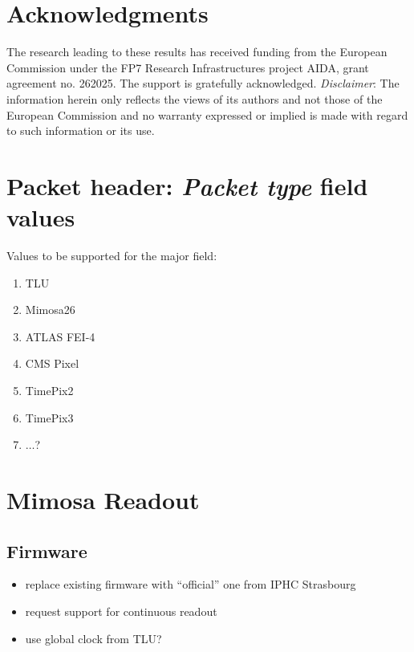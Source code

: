 \documentclass[paper=a4, fontsize=11pt, titlepage]{scrartcl}	%
\numberwithin{equation}{section}		%
\numberwithin{figure}{section}			%
\numberwithin{table}{section}           	%
\begin{document}
\section{Acknowledgments}

  The research leading to these results has received funding from the
  European Commission under the FP7 Research Infrastructures project
  AIDA, grant agreement no. 262025. The support is gratefully
  acknowledged. 
  \emph{Disclaimer}: The information herein only reflects the views of its authors and not those of the European Commission and no warranty expressed or implied is made with regard to such information or its use.

\newpage
\appendix

\section{Packet header: \emph{Packet type} field values}
\label{app:packettype}
Values to be supported for the major field:
\begin{enumerate}
\item TLU
\item Mimosa26
\item ATLAS FEI-4
\item CMS Pixel
\item TimePix2
\item TimePix3
\item $\ldots$?
\end{enumerate}

\section{Mimosa Readout}

\subsection{Firmware}
\label{sec:firmware}
\begin{itemize}
\item replace existing firmware with ``official'' one from IPHC Strasbourg
\item request support for continuous readout
\item use global clock from TLU?
\end{itemize}
\end{document}
